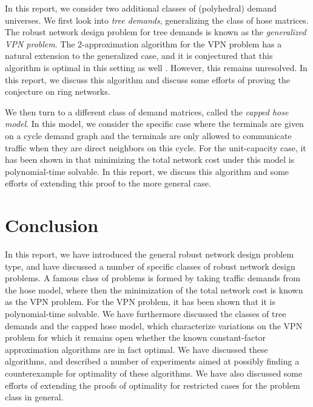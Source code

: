\documentclass[11pt]{article}
\theoremstyle{definition}
\begin{document}
    In this report, we consider two additional classes of (polyhedral) demand universes.
    We first look into \emph{tree demands}, generalizing the class of hose matrices.
    The robust network design problem for tree demands is known as the \emph{generalized VPN problem}.
    The 2-approximation algorithm for the VPN problem has a natural extension to the generalized case, and it is conjectured that this algorithm is optimal in this setting as well \cite{OLVER2016191}.
    However, this remains unresolved.
    In this report, we discuss this algorithm and discuss some efforts of proving the conjecture on ring networks.

    We then turn to a different class of demand matrices, called the \emph{capped hose model}.
    In this model, we consider the specific case where the terminals are given on a cycle demand graph and the terminals are only allowed to communicate traffic when they are direct neighbors on this cycle.
    For the unit-capacity case, it has been shown in \cite{bosman2017exploring} that minimizing the total network cost under this model is polynomial-time solvable.
    In this report, we discuss this algorithm and some efforts of extending this proof to the more general case.

    

    

    \section{Conclusion}
    In this report, we have introduced the general robust network design problem type, and have discussed a number of specific classes of robust network design problems.
    A famous class of problems is formed by taking traffic demands from the hose model, where then the minimization of the total network cost is known as the VPN problem.
    For the VPN problem, it has been shown that it is polynomial-time solvable.
    We have furthermore discussed the classes of tree demands and the capped hose model, which characterize variations on the VPN problem for which it remains open whether the known constant-factor approximation algorithms are in fact optimal.
    We have discussed these algorithms, and described a number of experiments aimed at possibly finding a counterexample for optimality of these algorithms.
    We have also discussed some efforts of extending the proofs of optimality for restricted cases for the problem class in general.

    
    

    \clearpage
    \appendix
    
\end{document}
